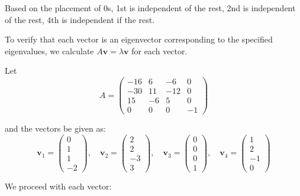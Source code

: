 \documentclass{article}
\begin{document}
Based on the placement of 0s, 1st is independent of the rest, 2nd is independent of the rest, 4th is independent if the rest.

To verify that each vector is an eigenvector corresponding to the specified eigenvalues, we calculate \( A \mathbf{v} = \lambda \mathbf{v} \) for each vector.

Let
\[
    A = \begin{pmatrix} -16 & 6 & -6 & 0 \\ -30 & 11 & -12 & 0 \\ 15 & -6 & 5 & 0 \\ 0 & 0 & 0 & -1 \end{pmatrix}
\]

and the vectors be given as:
\[
    \mathbf{v}_1 = \begin{pmatrix} 0 \\ 1 \\ 1 \\ -2 \end{pmatrix}, \quad \mathbf{v}_2 = \begin{pmatrix} 2 \\ 2 \\ -3 \\ 3 \end{pmatrix}, \quad \mathbf{v}_3 = \begin{pmatrix} 0 \\ 0 \\ 0 \\ 1 \end{pmatrix}, \quad \mathbf{v}_4 = \begin{pmatrix} 1 \\ 2 \\ -1 \\ 0 \end{pmatrix}
\]

We proceed with each vector:
\end{document}
